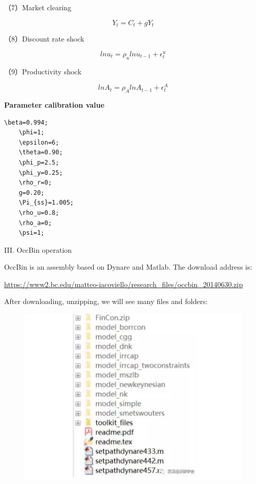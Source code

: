 \documentclass[10pt,math=newtx,citestyle=gb7714-2015,bibstyle=gb7714-2015]{elegantbook}
\begin{document}
{（7）Market clearing

$$Y_t=C_t+gY_t$$


（8）Discount rate shock

$$lnu_t=\rho_ulnu_{t-1}+\epsilon_t^u$$

（9）Productivity shock

$$lnA_t=\rho_AlnA_{t-1}+\epsilon_t^A$$


\textbf{Parameter calibration value}
\begin{lstlisting}[frame=shadowbox]
	\beta=0.994;
	\phi=1;
	\epsilon=6;
	\theta=0.90;
	\phi_p=2.5;
	\phi_y=0.25;
	\rho_r=0;
	g=0.20;
	\Pi_{ss}=1.005;
	\rho_u=0.8;
	\rho_a=0;
	\psi=1;
\end{lstlisting}
III. OccBin operation

OccBin is an assembly based on Dynare and Matlab. The download address is:

\url{https://www2.bc.edu/matteo-iacoviello/research_files/occbin_20140630.zip}

After downloading, unzipping, we will see many files and folders:

\begin{figure}[htbp!]
	\centering
	\includegraphics[width=0.5\linewidth]{FIG/folders}
	\centering
\end{figure}

}
\end{document}
